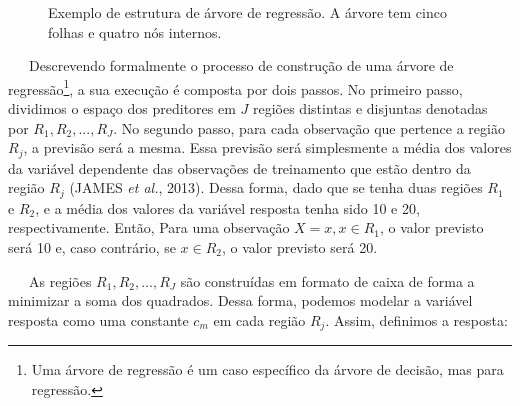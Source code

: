 \documentclass[
  12pt,
  letterpaper,
  DIV=11,
  numbers=noendperiod]{scrreprt}
\begin{document}
\begin{figure}


\caption{\label{fig-arvore}Exemplo de estrutura de árvore de regressão.
A árvore tem cinco folhas e quatro nós internos.}

\end{figure}%

\vspace{12pt}

~~~Descrevendo formalmente o processo de construção de uma árvore de
regressão\footnote{Uma árvore de regressão é um caso específico da
  árvore de decisão, mas para regressão.}, a sua execução é composta por
dois passos. No primeiro passo, dividimos o espaço dos preditores em
\(J\) regiões distintas e disjuntas denotadas por
\(R_1, R_2, ..., R_J\). No segundo passo, para cada observação que
pertence a região \(R_j\), a previsão será a mesma. Essa previsão será
simplesmente a média dos valores da variável dependente das observações
de treinamento que estão dentro da região \(R_j\) (JAMES \emph{et al.},
2013). Dessa forma, dado que se tenha duas regiões \(R_1\) e \(R_2\), e
a média dos valores da variável resposta tenha sido 10 e 20,
respectivamente. Então, Para uma observação \(X = x, x \in R_1\), o
valor previsto será 10 e, caso contrário, se \(x \in R_2\), o valor
previsto será 20.

\vspace{12pt}

~~~As regiões \(R_1, R_2, ..., R_J\) são construídas em formato de caixa
de forma a minimizar a soma dos quadrados. Dessa forma, podemos modelar
a variável resposta como uma constante \(c_m\) em cada região \(R_j\).
Assim, definimos a resposta:
\end{document}

